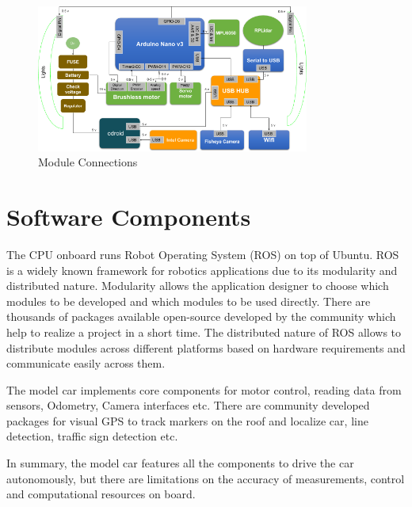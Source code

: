 \begin{figure}
	\centering
	\includegraphics[width=0.8\textwidth]{Images/platform/hardware_Connections.png}
	\caption{Module Connections \cite{model_car_archi}}
	\label{moduleconnections}
\end{figure}

\section{Software Components}
The CPU onboard runs Robot Operating System (ROS) on top of Ubuntu. ROS is a widely known framework for robotics applications due to its modularity and distributed nature. Modularity allows the application designer to choose which modules to be developed and which modules to be used directly. There are thousands of packages available open-source developed by the community which help to realize a project in a short time. The distributed nature of ROS allows to distribute modules across different platforms based on hardware requirements and communicate easily across them.

The model car implements core components for motor control, reading data from sensors, Odometry, Camera interfaces etc. There are community developed packages for visual GPS to track markers on the roof and localize car, line detection, traffic sign detection etc.

In summary, the model car features all the components to drive the car autonomously, but there are limitations on the accuracy of measurements, control and computational resources on board. 

